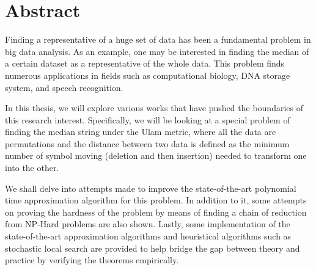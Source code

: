 \chapter*{Abstract}
Finding a representative of a huge set of data has been a fundamental problem in big data analysis. As an example, one may be interested in finding the median of a certain dataset as a representative of the whole data. This problem finds numerous applications in fields such as computational biology, DNA storage system, and speech recognition.

In this thesis, we will explore various works that have pushed the boundaries of this research interest. Specifically, we will be looking at a special problem of finding the median string under the Ulam metric, where all the data are permutations and the distance between two data is defined as the minimum number of symbol moving (deletion and then insertion) needed to transform one into the other.

We shall delve into attempts made to improve the state-of-the-art polynomial time approximation algorithm for this problem. In addition to it, some attempts on proving the hardness of the problem by means of finding a chain of reduction from NP-Hard problems are also shown. Lastly, some implementation of the state-of-the-art approximation algorithms and heuristical algorithms such as stochastic local search are provided to help bridge the gap between theory and practice by verifying the theorems empirically. 

